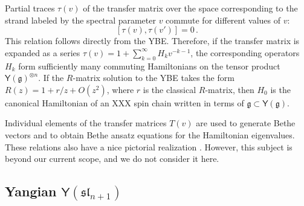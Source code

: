 \documentclass[10pt]{article}
\theoremstyle{definition}
\def\fg{\mathfrak{g}}
\def\fl{\mathfrak{l}}
\def\fs{\mathfrak{s}}
\def\fs{\mathfrak{s}}
\def\myY{{\mathsf{Y}}}
\def\lm{\limits}
\numberwithin{equation}{section}
\begin{document}
Partial traces $\tau(v)$ of the transfer matrix over the space corresponding to the strand labeled by the spectral parameter $v$ commute for different values of $v$:
\begin{equation}
	\left[\tau(v),\tau(v')\right]=0\,.
\end{equation}
This relation follows directly from the YBE.
Therefore, if the transfer matrix is expanded as a series $\tau(v)=1+\sum\lm_{k=0}^{\infty} H_k v^{-k-1}$, the corresponding operators $H_k$ form sufficiently many commuting Hamiltonians on the tensor product $\myY(\fg)^{\otimes n}$.
If the $R$-matrix solution to the YBE takes the form $R(z)=1+r/z+O(z^2)$, where $r$ is the classical $R$-matrix, then $H_0$ is the canonical Hamiltonian of an XXX spin chain written in terms of $\fg\subset \myY(\fg)$.

Individual elements of the transfer matrices $T(v)$ are used to generate Bethe vectors and to obtain Bethe ansatz equations for the Hamiltonian eigenvalues.
These relations also have a nice pictorial realization \cite{Litvinov:2020zeq,Yang:2024hsp}.
However, this subject is beyond our current scope, and we do not consider it here.




\subsection{Yangian \texorpdfstring{$\myY(\fs\fl_{n+1})$}{Y(sl(n+1))}}
\end{document}
